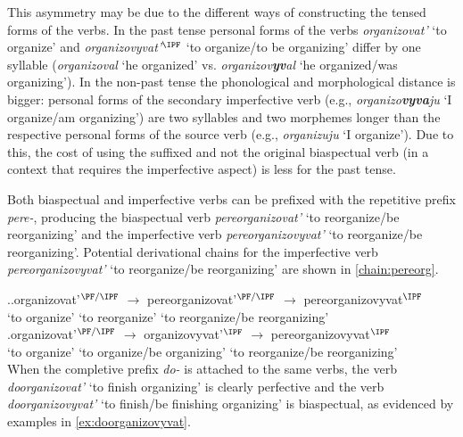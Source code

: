 This asymmetry may be due to the different ways of constructing the tensed forms of the verbs. In the past tense personal forms of the verbs \textit{organizovat'} `to organize' and \textit{organizovyvat'}$^{\IPF}$ `to organize/to be organizing' differ by one syllable (\textit{organizoval} `he organized' vs. \textit{organizov\textbf{yv}al} `he organized/was organizing'). In the non-past tense the phonological and morphological distance is bigger: personal forms of the secondary imperfective verb (e.g., \textit{organizo\textbf{vyva}ju} `I organize/am organizing') are two syllables and two morphemes longer than the respective personal forms of the source verb (e.g., \textit{organizuju} `I organize'). Due to this, the cost of using the suffixed and not the original biaspectual verb (in a context that requires the imperfective aspect) is less for the past tense.

Both biaspectual and imperfective verbs can be prefixed with the repetitive prefix \textit{pere-}, producing the biaspectual verb \textit{pereorganizovat'} `to reorganize/be reorganizing' and the imperfective verb \textit{pereorganizovyvat'} `to reorganize/be reorganizing'. Potential derivational chains for the imperfective verb \textit{pereorganizovyvat'} `to reorganize/be reorganizing' are shown in \ref{chain:pereorg}. 

\ex.\label{chain:pereorg}\ag.organizovat'$^{{\PF}/{\IPF}}$ {$\rightarrow$} {pereorganizovat'$^{{\PF}/{\IPF}}$} {$\rightarrow$} pereorganizovyvat$^{{\IPF}}$\\
{`to organize'} {} {`to reorganize'} {} {`to reorganize/be reorganizing'}\\
\bg.organizovat'$^{{\PF}/{\IPF}}$ {$\rightarrow$} {organizovyvat'$^{{\IPF}}$} {$\rightarrow$} pereorganizovyvat$^{{\IPF}}$\\
{`to organize'} {} {`to organize/be organizing'} {} {`to reorganize/be reorganizing'}\\

When the completive prefix \textit{do-} is attached to the same verbs, the verb \textit{doorganizovat'} `to finish organizing' is clearly perfective and the verb \textit{doorganizovyvat'} `to finish/be finishing organizing' is biaspectual, as evidenced by examples in \ref{ex:doorganizovyvat}.

